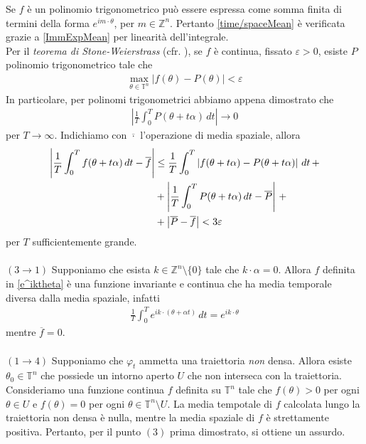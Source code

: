 \documentclass[twoside, 11pt]{amsbook}
\makeatletter
\newcommand{\0}{{(0)}}
\newcommand{\3}{{(3)}}
\theoremstyle{colonplain}
\theoremstyle{colondefinition}
\theoremstyle{colonremark}
\numberwithin{equation}{chapter}
\renewcommand{\proofname}{Dimostrazione}
\renewenvironment{proof}[1][\proofname]{\par
  \pushQED{\qed}%
  \normalfont \topsep6\p@\@plus6\p@\relax
  \trivlist
  \item[\hskip\labelsep\bfseries #1:]\ignorespaces
}{%
  \popQED\endtrivlist\@endpefalse
}
\makeatother
\begin{document}
\begin{proof}
Se $f$ è un polinomio trigonometrico può essere espressa come somma finita di termini della forma $e^{i m \cdot \theta}$, per $m \in \mathbb{Z}^n$. Pertanto \eqref{time/spaceMean} è verificata grazie a \eqref{ImmExpMean} per linearità dell'integrale. \\
Per il \textit{teorema di Stone-Weierstrass} (cfr. \cite{Pedersen}), se $f$ è continua, fissato $\varepsilon > 0$, esiste $P$ polinomio trigonometrico tale che
\begin{align}
    \max_{\theta \in \mathbb{T}^n} |f(\theta) - P(\theta)| < \varepsilon
\end{align}
In particolare, per polinomi trigonometrici abbiamo appena dimostrato che 
\begin{align}
    \left|\frac{1}{T}\int_0^T P(\theta + t\alpha) \, dt\right| \rightarrow 0
\end{align}
per $T \rightarrow \infty$. Indichiamo con $\overline{\cdot}$ l'operazione di media spaziale, allora
\begin{align}
    \left|\frac{1}{T}\int_0^T f(\theta + t\alpha) \, dt - \overline{f}\right| &\leq \frac{1}{T}\int_0^T \left|f(\theta + t\alpha) - P(\theta + t\alpha)\right| \, dt \, + \notag \\
    &+ \left|\frac{1}{T}\int_0^T P(\theta + t\alpha) \, dt - \overline{P}\right| \, + \notag \\
    &+ \left|\overline{P} - \overline{f}\right| < 3\varepsilon
\end{align}
per $T$ sufficientemente grande. \\ \\
$(3 \rightarrow 1)$ Supponiamo che esista $k \in \mathbb{Z}^n \setminus \{0\}$ tale che $k \cdot \alpha = 0$. Allora $f$ definita in \eqref{e^iktheta} è una funzione invariante e continua che ha media temporale diversa dalla media spaziale, infatti
\begin{align}
    \frac{1}{T}\int_0^T e^{i k \cdot (\theta + \alpha t)} \, dt = e^{i k \cdot \theta}
\end{align}
mentre $\overline{f} = 0$. \\ \\
$(1 \rightarrow 4)$ Supponiamo che $\varphi_t$ ammetta una traiettoria \textit{non} densa. Allora esiste $\theta_0 \in \mathbb{T}^n$ che possiede un intorno aperto $U$ che non interseca con la traiettoria. \\
Consideriamo una funzione continua $f$ definita su $\mathbb{T}^n$ tale che $f(\theta) > 0$ per ogni $\theta \in U$ e $f(\theta) = 0$ per ogni $\theta \in \mathbb{T}^n \setminus U$. La media tempotale di $f$ calcolata lungo la traiettoria non densa è nulla, mentre la media spaziale di $f$ è strettamente positiva. Pertanto, per il punto $(3)$ prima dimostrato, si ottiene un assurdo. \\ \\

\end{proof}
\end{document}
